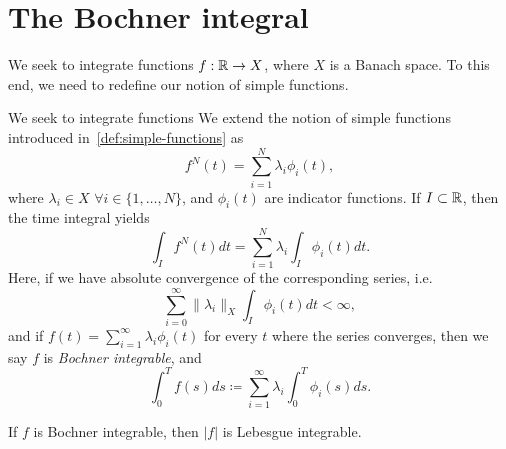 \section{The Bochner integral}\label{sec:bochner}
We seek to integrate functions $f:\mathbb{R}\to X$, where $X$ is a Banach space. To this end, we need to redefine our notion of simple functions. 
\begin{definition}\label{def:bochner-integral}
    We seek to integrate functions  We extend the notion of simple functions introduced in~\ref{def:simple-functions} as
    \begin{equation}
        f^N(t) = \sum_{i=1}^N \lambda_i \phi_i(t),
    \end{equation}
    where $\lambda_i \in X$ $\forall i\in\{1,\dots,N\}$, and $\phi_i(t)$ are indicator functions. If $I\subset \mathbb{R}$, then the time integral yields
    \begin{equation}
        \int_I f^N(t) dt = \sum_{i=1}^N \lambda_i \int_I \phi_i(t) dt.
    \end{equation}
    Here, if we have absolute convergence of the corresponding series, i.e. 
    \begin{equation}
        \sum_{i=0}^{\infty} \|\lambda_i\|_X \int_I \phi_i(t)dt <\infty,
    \end{equation}
    and if $f(t) = \sum_{i=1}^{\infty} \lambda_i \phi_i(t)$ for every $t$ where the series converges, then we say $f$ is \emph{Bochner integrable}, and
    \begin{equation}
        \int_0^T f(s)ds \coloneqq  \sum_{i=1}^\infty \lambda_i \int_0^T \phi_i(s)ds.
    \end{equation}    
\end{definition}
\begin{corollary}
    If $f$ is Bochner integrable, then $|f|$ is Lebesgue integrable. 
\end{corollary}

